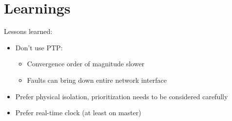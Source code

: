 
\section{Learnings}
Lessons learned:
\begin{itemize}
    \item Don't use PTP:
    \begin{itemize}
        \item Convergence order of magnitude slower
        \item Faults can bring down entire network interface
    \end{itemize}
    \item Prefer physical isolation, prioritization needs to be considered carefully
    \item Prefer real-time clock (at least on master)
\end{itemize}